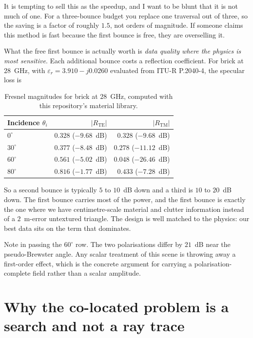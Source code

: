 \documentclass[11pt,a4paper]{article}
\begin{document}
It is tempting to sell this as the speedup, and I want to be blunt that it is
not much of one. For a three-bounce budget you replace one traversal out of
three, so the saving is a factor of roughly $1.5$, not orders of magnitude. If
someone claims this method is fast because the first bounce is free, they are
overselling it.

What the free first bounce is actually worth is \emph{data quality where the
physics is most sensitive}. Each additional bounce costs a reflection
coefficient. For brick at $28$~GHz, with $\varepsilon_r = 3.910 - j0.0260$
evaluated from ITU-R P.2040-4, the specular loss is

\begin{table}[h]
\centering
\begin{tabular}{lrr}
\toprule
Incidence $\theta_i$ & $|R_{\text{TE}}|$ & $|R_{\text{TM}}|$ \\
\midrule
$0^\circ$  & $0.328$ \;($-9.68$~dB)  & $0.328$ \;($-9.68$~dB) \\
$30^\circ$ & $0.377$ \;($-8.48$~dB)  & $0.278$ \;($-11.12$~dB) \\
$60^\circ$ & $0.561$ \;($-5.02$~dB)  & $0.048$ \;($-26.46$~dB) \\
$80^\circ$ & $0.816$ \;($-1.77$~dB)  & $0.433$ \;($-7.28$~dB) \\
\bottomrule
\end{tabular}
\caption{Fresnel magnitudes for brick at $28$~GHz, computed with this repository's
material library.}
\end{table}

So a second bounce is typically $5$ to $10$~dB down and a third is $10$ to
$20$~dB down. The first bounce carries most of the power, and the first bounce is
exactly the one where we have centimetre-scale material and clutter information
instead of a $2$~m-error untextured triangle. The design is well matched to the
physics: our best data sits on the term that dominates.

Note in passing the $60^\circ$ row. The two polarisations differ by $21$~dB near
the pseudo-Brewster angle. Any scalar treatment of this scene is throwing away a
first-order effect, which is the concrete argument for carrying a
polarisation-complete field rather than a scalar amplitude.

\section{Why the co-located problem is a search and not a ray trace}
\end{document}
